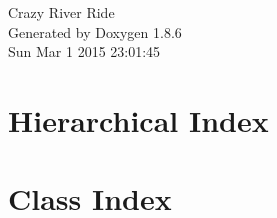 \documentclass[twoside]{book}
\newcommand{\clearemptydoublepage}{%
  \newpage{\pagestyle{empty}\cleardoublepage}%
}
\begin{document}
\hypersetup{pageanchor=false}
\begin{titlepage}
\vspace*{7cm}
\begin{center}%
{\Large Crazy River Ride }\\
\vspace*{1cm}
{\large Generated by Doxygen 1.8.6}\\
\vspace*{0.5cm}
{\small Sun Mar 1 2015 23:01:45}\\
\end{center}
\end{titlepage}
\clearemptydoublepage
\tableofcontents
\clearemptydoublepage
{}
\hypersetup{pageanchor=true}

\chapter{Hierarchical Index}

\chapter{Class Index}

\end{document}
